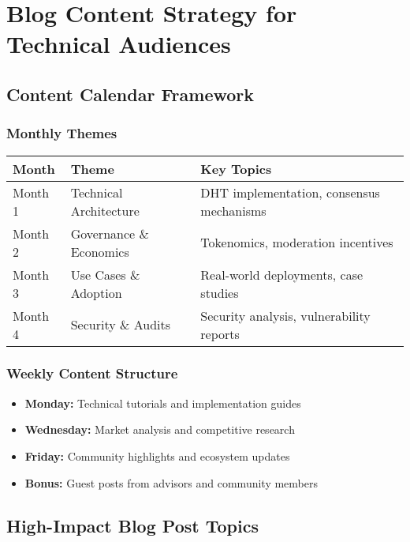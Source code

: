 \documentclass[12pt,a4paper]{article}
\begin{document}
\section{Blog Content Strategy for Technical Audiences}

\subsection{Content Calendar Framework}

\subsubsection{Monthly Themes}
\begin{center}
\begin{tabular}{|l|l|p{6cm}|}
\hline
\textbf{Month} & \textbf{Theme} & \textbf{Key Topics} \\
\hline
Month 1 & Technical Architecture & DHT implementation, consensus mechanisms \\
Month 2 & Governance \& Economics & Tokenomics, moderation incentives \\
Month 3 & Use Cases \& Adoption & Real-world deployments, case studies \\
Month 4 & Security \& Audits & Security analysis, vulnerability reports \\
\hline
\end{tabular}
\end{center}

\subsubsection{Weekly Content Structure}
\begin{itemize}
    \item \textbf{Monday:} Technical tutorials and implementation guides
    \item \textbf{Wednesday:} Market analysis and competitive research  
    \item \textbf{Friday:} Community highlights and ecosystem updates
    \item \textbf{Bonus:} Guest posts from advisors and community members
\end{itemize}

\subsection{High-Impact Blog Post Topics}
\end{document}
